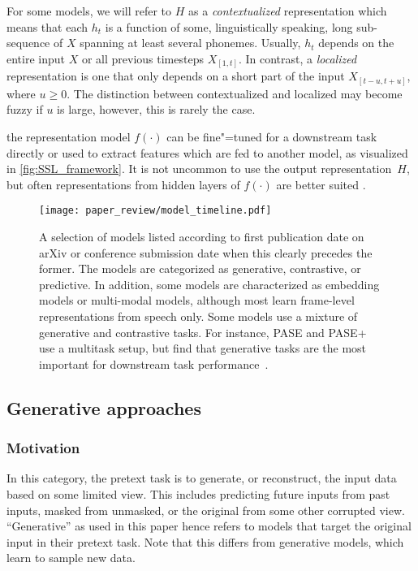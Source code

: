 For some models, we will refer to $H$ as a \emph{contextualized} representation which means that each $h_t$ is a function of some, linguistically speaking, long sub-sequence of $X$ spanning at least several phonemes. Usually, $h_t$ depends on the entire input $X$ or all previous timesteps $X_{[1,t]}$. In contrast, a \emph{localized} representation is one that only depends on a short part of the input $X_{[t - u,t + u]}$, where $u \geq 0$. The distinction between contextualized and localized may become fuzzy if $u$ is large, however, this is rarely the case.

 the representation model $f(\cdot)$ can be fine"=tuned for a downstream task directly or used to extract features which are fed to another model, as visualized in \cref{fig:SSL_framework}. It is not uncommon to use the output representation~$H$, but often representations from hidden layers of $f(\cdot)$ are better suited \parencite{pasad_layerwise_2021}.


\begin{figure*}
    \centering
    \texttt{[image: paper\_review/model\_timeline.pdf]}
	 \caption[Selection of self"=supervised models for speech.]{ A selection of models listed according to first publication date
	 on arXiv or conference submission date when this clearly precedes the
	 former. The models are categorized as generative, contrastive, or predictive.
	 In addition, some models are characterized as embedding models or
	 multi-modal models, although most learn frame-level
	 representations from speech only. Some models use a mixture of generative
	 and contrastive tasks. For instance, PASE and PASE+ use a multitask setup,
	 but find that generative tasks are the most important for downstream
	 task performance~\parencite{pascual_learning_2019}.}
    \label{fig:timeline}
\end{figure*}


 

\subsection{Generative approaches}
\label{sec:generative}

\subsubsection{Motivation}

In this category, the pretext task is to generate, or reconstruct, the input data based on some limited view. This includes predicting future inputs from past inputs, masked from unmasked, or the original from some other corrupted view.  ``Generative'' as used in this paper hence refers to models that target the original input in their pretext task. Note that this differs from generative models, which learn  to sample new data.

